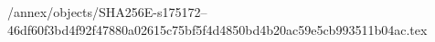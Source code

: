 /annex/objects/SHA256E-s175172--46df60f3bd4f92f47880a02615c75bf5f4d4850bd4b20ac59e5cb993511b04ac.tex

